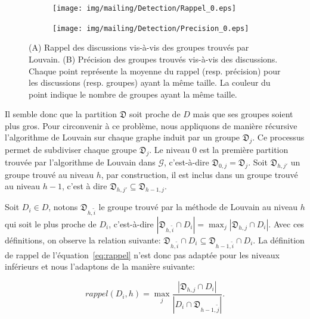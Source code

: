 \begin{figure}
\centering

\hfill
	\begin{subfigure}{0.45\textwidth}
		\texttt{[image: img/mailing/Detection/Rappel\_0.eps]}
		\caption{}		
	\end{subfigure}\hfill
	\begin{subfigure}{0.45\textwidth}
		\texttt{[image: img/mailing/Detection/Precision\_0.eps]}
		\caption{}		
	\end{subfigure}\hfill

\caption{(A) Rappel des discussions vis-à-vis des groupes trouvés par Louvain.
 (B) Précision des groupes trouvés vis-à-vis des discussions.
Chaque point représente la moyenne du rappel (resp. précision) pour les discussions (resp. groupes) ayant la même taille.
La couleur du point indique le nombre de groupes ayant la même taille.}
\label{fig:rec_inclusion_niveau0}
\end{figure}


Il semble donc que la partition $\mathfrak{D}$ soit proche de $D$ mais que ses groupes soient plus gros.
Pour circonvenir à ce problème, nous appliquons de manière récursive l'algorithme de Louvain sur chaque graphe induit par un groupe $\mathfrak{D}_j$.
Ce processus permet de subdiviser chaque groupe $\mathfrak{D}_j$.
Le niveau $0$ est la première partition trouvée par l'algorithme de Louvain dans $\mathcal{G}$, c'est-à-dire $\mathfrak{D}_{0,j}=\mathfrak{D}_j$.
Soit $\mathfrak{D}_{h,j'}$ un groupe trouvé au niveau $h$, par construction, il est inclus dans un groupe trouvé au niveau $h-1$, c'est à dire $\mathfrak{D}_{h,j'} \subseteq \mathfrak{D}_{h-1,j}$.


Soit $D_i \in D$, notons $\mathfrak{D}_{h,\tilde{i}}$ le groupe trouvé par la méthode de Louvain au niveau $h$ qui soit le plus proche de $D_i$, c'est-à-dire $|\mathfrak{D}_{h,\tilde{i}}\cap D_i|= \max_{j} |\mathfrak{D}_{h,j} \cap D_i|$.
Avec ces définitions, on observe la relation suivante: $\mathfrak{D}_{h,\tilde{i}}\cap D_i \subseteq \mathfrak{D}_{h-1,\tilde{i}}\cap D_i$.
La définition de rappel de l'équation~\ref{eq:rappel} n'est donc pas adaptée pour les niveaux inférieurs et nous l'adaptons de la manière suivante:

\begin{equation}
rappel(D_i,h)= \max_{j} \frac{|\mathfrak{D}_{h,j} \cap D_i|}{|D_i \cap \mathfrak{D}_{h-1,\tilde{j}}|}.
\end{equation}

